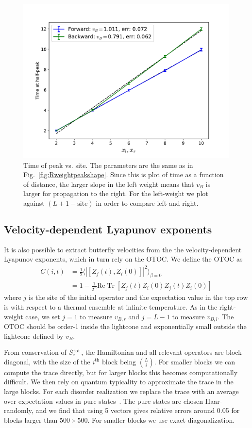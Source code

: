 \documentclass[aps,prx,reprint,superscriptaddress, longbibliography]{revtex4-1}
\newcommand{\charlie}[1]{{\color{Magenta}{{#1}}}}
\newcommand{\Tr}{ \mbox{Tr}}
\renewcommand{\Re}{ \mbox{Re}}
\newcommand{\Sz}{S_z^{\rm tot}}
\newcommand{\half}{\frac{1}{2}}
\begin{document}
\begin{figure}
	\includegraphics[width=\columnwidth]{Rweighthalftimes}
	\caption{Time of peak vs. site. The parameters are the same as in Fig.~\ref{fig:Rweightpeakshape}. Since this is plot of time as a function of distance, the larger slope in the left weight means that $v_B$ is larger for propagation to the right. For the left-weight we plot against $(L+1-\text{site})$ in order to compare left and right.}
	\label{fig:Rweightpeaktimes}
\end{figure}

\subsection{Velocity-dependent Lyapunov exponents}

It is also possible to extract butterfly velocities from the the velocity-dependent Lyapunov exponents, which in turn rely on the OTOC. We define the OTOC as 
\begin{align}
C(i,t) & = \half \langle|[Z_j(t),Z_i(0)]|^2\rangle_{\beta=0}\nonumber\\
&= 1 - \frac{1}{2^{L}}\Re\;\Tr\;[Z_j(t)Z_i(0)Z_j(t)Z_i(0)]
\end{align}
where $j$ is the site of the initial operator and the expectation value in the top row is with respect to a thermal ensemble at infinite temperature. As in the right-weight case, we set $j=1$ to measure $v_{B,r}$ and $j=L-1$ to measure $v_{B,l}$. The OTOC should be order-1 inside the lightcone and exponentially small outside the lightcone defined by $v_B$.

\charlie{Move this paragraph to an appendix?}
From conservation of $\Sz$, the Hamiltonian and all relevant operators are block-diagonal, with the size of the $i^\text{th}$ block being $\binom{L}{i}$. For smaller blocks we can compute the trace directly, but for larger blocks this becomes computationally difficult. We then rely on quantum typicality to approximate the trace in the large blocks. For each disorder realization we replace the trace with an average over expectation values in pure states~\cite{Luitz2017}. The pure states are chosen Haar-randomly, and we find that using 5 vectors gives relative errors around 0.05 for blocks larger than $500\times 500$. For smaller blocks we use exact diagonalization.
\end{document}
